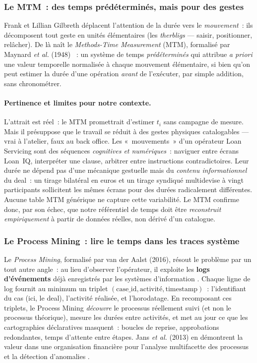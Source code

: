 \subsubsection{Le MTM~: des temps prédéterminés, mais pour des gestes}

Frank et Lillian Gilbreth déplacent l'attention de la durée vers le \emph{mouvement}~:
ils décomposent tout geste en unités élémentaires (les \textit{therbligs} --- saisir,
positionner, relâcher). De là naît le \textit{Methods-Time Measurement} (MTM), formalisé
par Maynard \textit{et al.} (1948) \cite{gilbreth1917, maynard1948}~: un système de temps
\emph{prédéterminés} qui attribue \textit{a priori} une valeur temporelle normalisée à
chaque mouvement élémentaire, si bien qu'on peut estimer la durée d'une opération
\emph{avant} de l'exécuter, par simple addition, sans chronométrer.

\paragraph{Pertinence et limites pour notre contexte.}
L'attrait est réel~: le MTM promettrait d'estimer $t_i$ sans campagne de mesure. Mais il
présuppose que le travail se réduit à des gestes physiques catalogables --- vrai à
l'atelier, faux au back office. Les «~mouvements~» d'un opérateur Loan Servicing sont des
séquences \emph{cognitives et numériques}~: naviguer entre écrans Loan~IQ, interpréter
une clause, arbitrer entre instructions contradictoires. Leur durée ne dépend pas d'une
mécanique gestuelle mais du \emph{contenu informationnel} du deal~: un tirage bilatéral
en euros et un tirage syndiqué multidevise à vingt participants sollicitent les mêmes
écrans pour des durées radicalement différentes. Aucune table MTM générique ne capture
cette variabilité. Le MTM confirme donc, par son échec, que notre référentiel de temps
doit être \emph{reconstruit empiriquement} à partir de données réelles, non dérivé d'un
catalogue.

\subsubsection{Le Process Mining~: lire le temps dans les traces système}

Le \textit{Process Mining}, formalisé par van der Aalst (2016), résout le problème par un
tout autre angle~: au lieu d'observer l'opérateur, il exploite les \textbf{logs
d'événements} déjà enregistrés par les systèmes d'information \cite{vanderaalst2016}.
Chaque ligne de log fournit au minimum un triplet $(\text{case\_id}, \text{activité},
\text{timestamp})$~: l'identifiant du cas (ici, le deal), l'activité réalisée, et
l'horodatage. En recomposant ces triplets, le Process Mining \emph{découvre} le
processus réellement suivi (et non le processus théorique), mesure les durées entre
activités, et met au jour ce que les cartographies déclaratives masquent~: boucles de
reprise, approbations redondantes, temps d'attente entre étapes. Jans \textit{et al.}
(2013) en démontrent la valeur dans une organisation financière pour l'analyse
multifacette des processus et la détection d'anomalies \cite{jans2013}.

